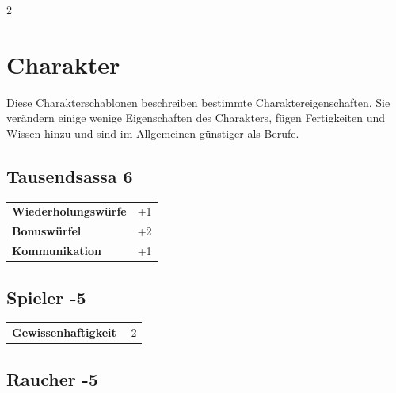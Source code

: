 \begin{multicols}{2}
\begin{tcolorbox}
\end{tcolorbox}

\section{Charakter}

Diese Charakterschablonen beschreiben bestimmte Charaktereigenschaften. Sie verändern einige wenige Eigenschaften des Charakters, fügen Fertigkeiten und Wissen hinzu und sind im Allgemeinen günstiger als Berufe.

\begin{tcolorbox}
    \subsection*{Tausendsassa \hfill \small{6 }}
    \tcblower




\begin{tabular}{@{}ll@{}}
    \textbf{Wiederholungswürfe} & +1\\
    \textbf{Bonuswürfel} & +2\\
    \textbf{Kommunikation} & +1\\
\end{tabular}


\end{tcolorbox}

\begin{tcolorbox}
    \subsection*{Spieler \hfill \small{-5 }}
    \tcblower




\begin{tabular}{@{}ll@{}}
    \textbf{Gewissenhaftigkeit} & -2\\
\end{tabular}


\end{tcolorbox}

\begin{tcolorbox}
    \subsection*{Raucher \hfill \small{-5 }}
    \tcblower





\end{tcolorbox}
\end{multicols}
